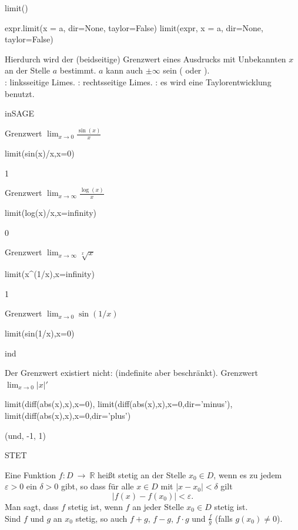 \documentclass[fontsize=12pt,paper=a4,twoside,bibtotoc,idxtotoc,
liststotoc,pagesize,BCOR1.2cm,DIV15,chapterprefix,pagesize=pdftex]{scrbook}
\theoremstyle{plain}
\theoremstyle{definition}
\theoremstyle{remark}
\begin{document}
limit()

\begin{sagein}
expr.limit(x = a, dir=None, taylor=False)
limit(expr, x = a, dir=None, taylor=False)
\end{sagein}
Hierdurch wird der (beidseitige) Grenzwert eines Ausdrucks mit Unbekannten $x$ an
der Stelle $a$ bestimmt. $a$ kann auch $\pm \infty$ sein ( oder ).\\

  : linksseitige Limes. 
 : rechtsseitige Limes.
 : es wird eine Taylorentwicklung benutzt. 


inSAGE


 Grenzwert $\lim_{x \rightarrow 0}
\frac{\sin(x)}{x}$
\begin{sagein}
limit(sin(x)/x,x=0)
\end{sagein}
\begin{sage}
  1
\end{sage}
 Grenzwert $\lim_{x \rightarrow \infty}
\frac{\log(x)}{x}$
\begin{sagein}
limit(log(x)/x,x=infinity)
\end{sagein}
\begin{sage}
  0
\end{sage}
 Grenzwert $\lim_{x \rightarrow \infty} \sqrt[x]{x}$
\begin{sagein}
limit(x^(1/x),x=infinity)
\end{sagein}
\begin{sage}
  1
\end{sage}
 Grenzwert $\lim_{x \rightarrow 0}
\sin(1/x)$
\begin{sagein}
limit(sin(1/x),x=0)
\end{sagein}
\begin{sage}
  ind
\end{sage}
Der Grenzwert existiert nicht:  (indefinite aber beschränkt). 
 Grenzwert $\lim_{x \rightarrow 0} |x|' $
\begin{sagein}
limit(diff(abs(x),x),x=0),
limit(diff(abs(x),x),x=0,dir='minus'),
limit(diff(abs(x),x),x=0,dir='plus')
\end{sagein}
\begin{sage}
  (und, -1, 1)
\end{sage}


STET

Eine Funktion $f:D \ \rightarrow  \ \mathbb{R}$ heißt {\color{red} stetig an
der Stelle $x_0 \in D$}, wenn es zu jedem $\varepsilon>0$ ein $\delta>0$
gibt, so dass für alle $x \in D$ mit $|x - x_0| < \delta$ gilt
\[ |f(x)-f(x_0) | < \varepsilon .\]
Man sagt, dass $f$ {\color{red} stetig} ist, wenn $f$ an jeder Stelle $x_0
\in D$ stetig ist. \\
Sind $f$ und $g$ an $x_0$ stetig, so auch $f+g$, $f-g$, $f \cdot g$
und $\frac{f}{g}$ (falls $g(x_0) \neq 0$). 
\end{document}
